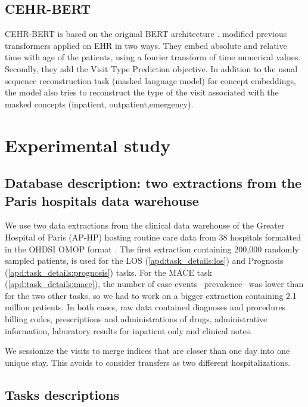 \documentclass[french,12pt,twoside,a4paper]{book}
\begin{document}
\begin{appendices}
  \subsection{CEHR-BERT}\label{apd:pipelines:cehr_bert}

  CEHR-BERT is based on the original BERT architecture \citep{devlin2018bert}.
  \cite{pang2021cehr} modified previous transformers applied on EHR in two ways.
  They embed absolute and relative time with age of the patients, using a fourier
  transform of time numerical values. Secondly, they add the Visit Type Prediction
  objective. In addition to the usual sequence reconstruction task (masked
  language model) for concept embeddings, the model also tries to reconstruct the
  type of the visit associated with the masked concepts (inpatient,
  outpatient,emergency).

  \section{Experimental study}\label{apd:predictive_models:experimental_study}

  \subsection{Database description: two extractions from the Paris hospitals data warehouse}%
  \label{apd:database_description}

  We use two data extractions from the clinical data warehouse of the Greater
  Hospital of Paris (AP-HP) hosting routine care data from 38 hospitals formatted
  in the OHDSI OMOP format \citep{hripcsak2015observational}. The first extraction
  containing 200,000 randomly sampled patients, is used for the LOS
  (\ref{apd:task_details:los}) and Prognosis
  (\ref{apd:task_details:prognosis}) tasks. For the MACE task
  (\ref{apd:task_details:mace}), the number of case events --prevalence-- was
  lower than for the two other tasks, so we had to work on a bigger extraction
  containing 2.1 million patients. In both cases, raw data contained diagnoses and
  procedures billing codes, prescriptions and administrations of drugs,
  administrative information, laboratory results for inpatient only and clinical
  notes.

  We sessionize the visits to merge indices that are closer than one day into one
  unique stay. This avoids to consider transfers as two different hospitalizations.

  \subsection{Tasks descriptions}\label{apd:tasks:population_selection}


\end{appendices}
\end{document}
